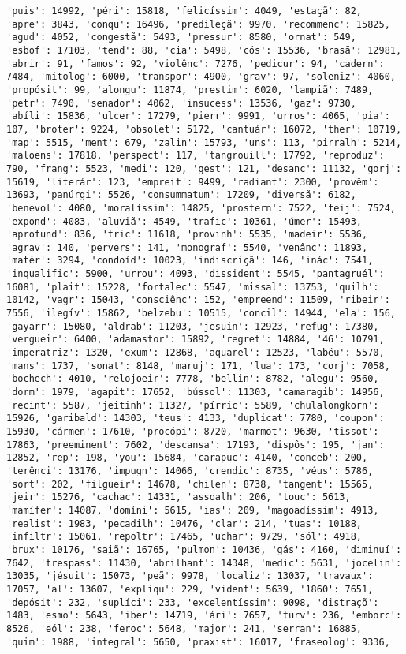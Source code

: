 \begin{Verbatim}[commandchars=\\\{\}]
'puis': 14992, 'péri': 15818, 'felicíssim': 4049, 'estaçã': 82, 'apre': 3843, 'conqu': 16496, 'predileçã': 9970, 'recommenc': 15825, 'agud': 4052, 'congestã': 5493, 'pressur': 8580, 'ornat': 549, 'esbof': 17103, 'tend': 88, 'cia': 5498, 'cós': 15536, 'brasã': 12981, 'abrir': 91, 'famos': 92, 'violênc': 7276, 'pedicur': 94, 'cadern': 7484, 'mitolog': 6000, 'transpor': 4900, 'grav': 97, 'soleniz': 4060, 'propósit': 99, 'alongu': 11874, 'prestim': 6020, 'lampiã': 7489, 'petr': 7490, 'senador': 4062, 'insucess': 13536, 'gaz': 9730, 'abíli': 15836, 'ulcer': 17279, 'pierr': 9991, 'urros': 4065, 'pia': 107, 'broter': 9224, 'obsolet': 5172, 'cantuár': 16072, 'ther': 10719, 'map': 5515, 'ment': 679, 'zalin': 15793, 'uns': 113, 'pirralh': 5214, 'maloens': 17818, 'perspect': 117, 'tangrouill': 17792, 'reproduz': 790, 'frang': 5523, 'medi': 120, 'gest': 121, 'desanc': 11132, 'gorj': 15619, 'literár': 123, 'empreit': 9499, 'radiant': 2300, 'provêm': 13693, 'panúrgi': 5526, 'consummatum': 17209, 'diversã': 6182, 'benevol': 4080, 'moralíssim': 14825, 'prostern': 7522, 'feij': 7524, 'expond': 4083, 'aluviã': 4549, 'trafic': 10361, 'úmer': 15493, 'aprofund': 836, 'tric': 11618, 'provinh': 5535, 'madeir': 5536, 'agrav': 140, 'pervers': 141, 'monograf': 5540, 'venânc': 11893, 'matér': 3294, 'condoíd': 10023, 'indiscriçã': 146, 'inác': 7541, 'inqualific': 5900, 'urrou': 4093, 'dissident': 5545, 'pantagruél': 16081, 'plait': 15228, 'fortalec': 5547, 'missal': 13753, 'quilh': 10142, 'vagr': 15043, 'consciênc': 152, 'empreend': 11509, 'ribeir': 7556, 'ilegív': 15862, 'belzebu': 10515, 'concil': 14944, 'ela': 156, 'gayarr': 15080, 'aldrab': 11203, 'jesuin': 12923, 'refug': 17380, 'vergueir': 6400, 'adamastor': 15892, 'regret': 14884, '46': 10791, 'imperatriz': 1320, 'exum': 12868, 'aquarel': 12523, 'labéu': 5570, 'mans': 1737, 'sonat': 8148, 'maruj': 171, 'lua': 173, 'corj': 7058, 'bochech': 4010, 'relojoeir': 7778, 'bellin': 8782, 'alegu': 9560, 'dorm': 1979, 'agapit': 17652, 'bússol': 11303, 'camaragib': 14956, 'recint': 5587, 'jeitinh': 11327, 'pírric': 5589, 'chulalongkorn': 15926, 'garibald': 14303, 'teus': 4133, 'duplicat': 7780, 'coupon': 15930, 'cármen': 17610, 'procópi': 8720, 'marmot': 9630, 'tissot': 17863, 'preeminent': 7602, 'descansa': 17193, 'dispôs': 195, 'jan': 12852, 'rep': 198, 'you': 15684, 'carapuc': 4140, 'conceb': 200, 'terênci': 13176, 'impugn': 14066, 'crendic': 8735, 'véus': 5786, 'sort': 202, 'filgueir': 14678, 'chilen': 8738, 'tangent': 15565, 'jeir': 15276, 'cachac': 14331, 'assoalh': 206, 'touc': 5613, 'mamífer': 14087, 'domíni': 5615, 'ias': 209, 'magoadíssim': 4913, 'realist': 1983, 'pecadilh': 10476, 'clar': 214, 'tuas': 10188, 'infiltr': 15061, 'repoltr': 17465, 'uchar': 9729, 'sól': 4918, 'brux': 10176, 'saiã': 16765, 'pulmon': 10436, 'gás': 4160, 'diminuí': 7642, 'trespass': 11430, 'abrilhant': 14348, 'medic': 5631, 'jocelin': 13035, 'jésuit': 15073, 'peã': 9978, 'localiz': 13037, 'travaux': 17057, 'al': 13607, 'expliqu': 229, 'vident': 5639, '1860': 7651, 'depósit': 232, 'suplíci': 233, 'excelentíssim': 9098, 'distraçõ': 1483, 'esmo': 5643, 'iber': 14719, 'ári': 7657, 'turv': 236, 'emborc': 8526, 'eól': 238, 'feroc': 5648, 'major': 241, 'serran': 16885, 'quim': 1988, 'integral': 5650, 'praxist': 16017, 'fraseolog': 9336, 
\end{Verbatim}
